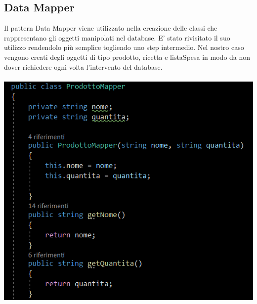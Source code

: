 \documentclass[a4paper, titlepage]{article}
\begin{document}
\subsection{Data Mapper}
Il pattern Data Mapper viene utilizzato nella creazione delle classi che rappresentano gli oggetti manipolati nel database.
E' stato rivisitato il suo utilizzo rendendolo più semplice togliendo uno step intermedio.
Nel nostro caso vengono creati degli oggetti di tipo prodotto, ricetta e listaSpesa in modo da non dover richiedere ogni volta l'intervento del database.\\\\
\includegraphics[scale=0.70]{Immagini/DataMapper.PNG}
\newpage
\end{document}
